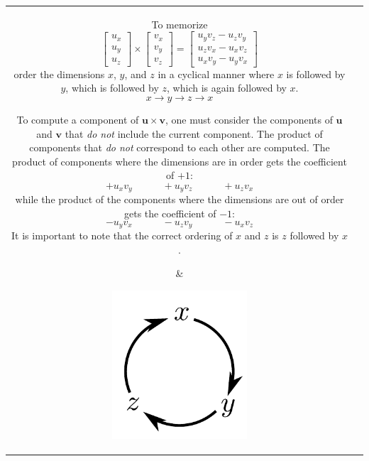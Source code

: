\documentclass{article}
\begin{document}
\begin{center}
\begin{tabular}{cc}
\parbox{0.6\textwidth}{
To memorize
\[\begin{bmatrix} u_x \\ u_y \\ u_z \end{bmatrix} \times \begin{bmatrix} v_x \\ v_y \\ v_z \end{bmatrix} = \begin{bmatrix} u_y v_z - u_z v_y \\ u_z v_x - u_x v_z \\ u_x v_y - u_y v_x \end{bmatrix}\]
order the dimensions \(x\), \(y\), and \(z\) in a cyclical manner where \(x\) is followed by \(y\), which is followed by \(z\), which is again followed by \(x\). 
\[x \rightarrow y \rightarrow z \rightarrow x\] 

To compute a component of \(\mathbf{u} \times \mathbf{v}\), one must consider the components of \(\mathbf{u}\) and \(\mathbf{v}\) that \emph{do not} include the current component. The product of components that \emph{do not} correspond to each other are computed. The product of components where the dimensions are in order gets the coefficient of \(+1\):
\[+u_x v_y \quad\quad\quad +u_y v_z \quad\quad\quad +u_z v_x\]
 while the product of the components where the dimensions are out of order gets the coefficient of \(-1\):
\[-u_y v_x \quad\quad\quad -u_z v_y \quad\quad\quad -u_x v_z\]
It is important to note that the correct ordering of \(x\) and \(z\) is \(z\) followed by \(x\).
} & \parbox{0.4\textwidth}{
\includegraphics[width = 0.4\textwidth]{x_y_z_cycle}
}
\end{tabular}
\end{center}
\end{document}
